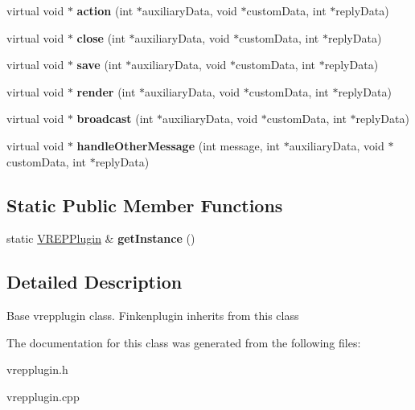 \begin{DoxyCompactItemize}
\item 
virtual void $\ast$ {\bfseries action} (int $\ast$auxiliary\+Data, void $\ast$custom\+Data, int $\ast$reply\+Data)\hypertarget{classVREPPlugin_a048e1fbf7b4b5b7b96ea6ec132218e12}{}\label{classVREPPlugin_a048e1fbf7b4b5b7b96ea6ec132218e12}

\item 
virtual void $\ast$ {\bfseries close} (int $\ast$auxiliary\+Data, void $\ast$custom\+Data, int $\ast$reply\+Data)\hypertarget{classVREPPlugin_af9fc2e6b9adf1436fc06e2555eaa3c2b}{}\label{classVREPPlugin_af9fc2e6b9adf1436fc06e2555eaa3c2b}

\item 
virtual void $\ast$ {\bfseries save} (int $\ast$auxiliary\+Data, void $\ast$custom\+Data, int $\ast$reply\+Data)\hypertarget{classVREPPlugin_af6a19ea1a3fbe91a86df1e92e6f623a2}{}\label{classVREPPlugin_af6a19ea1a3fbe91a86df1e92e6f623a2}

\item 
virtual void $\ast$ {\bfseries render} (int $\ast$auxiliary\+Data, void $\ast$custom\+Data, int $\ast$reply\+Data)\hypertarget{classVREPPlugin_a3fce674766334a4ad6c63a179dff64ae}{}\label{classVREPPlugin_a3fce674766334a4ad6c63a179dff64ae}

\item 
virtual void $\ast$ {\bfseries broadcast} (int $\ast$auxiliary\+Data, void $\ast$custom\+Data, int $\ast$reply\+Data)\hypertarget{classVREPPlugin_aa04f0d2bb1b0d73a46a99e699e11830f}{}\label{classVREPPlugin_aa04f0d2bb1b0d73a46a99e699e11830f}

\item 
virtual void $\ast$ {\bfseries handle\+Other\+Message} (int message, int $\ast$auxiliary\+Data, void $\ast$custom\+Data, int $\ast$reply\+Data)\hypertarget{classVREPPlugin_af3a92d9202afe61bf4979d0e24bd5425}{}\label{classVREPPlugin_af3a92d9202afe61bf4979d0e24bd5425}

\end{DoxyCompactItemize}
\subsection*{Static Public Member Functions}
\begin{DoxyCompactItemize}
\item 
static \hyperlink{classVREPPlugin}{V\+R\+E\+P\+Plugin} \& {\bfseries get\+Instance} ()\hypertarget{classVREPPlugin_a6c54bebcd2d0c09e7a20dd72ae82ec71}{}\label{classVREPPlugin_a6c54bebcd2d0c09e7a20dd72ae82ec71}

\end{DoxyCompactItemize}


\subsection{Detailed Description}
Base vrepplugin class. Finkenplugin inherits from this class 

The documentation for this class was generated from the following files\+:\begin{DoxyCompactItemize}
\item 
vrepplugin.\+h\item 
vrepplugin.\+cpp\end{DoxyCompactItemize}
